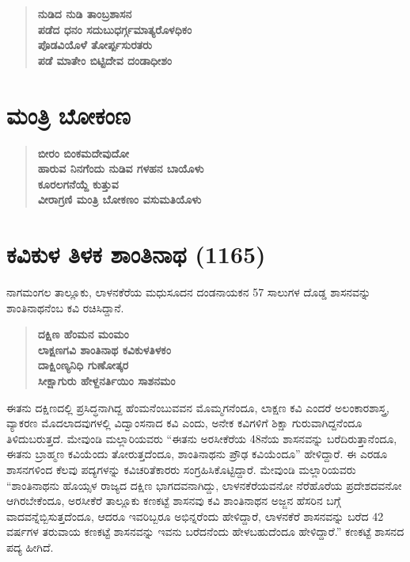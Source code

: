 \begin{verse}
\textbf{ನುಡಿದ ನುಡಿ ತಾಂಬ್ರಶಾಸನ} \\\textbf{ಪಡೆದ ಧನಂ ಸದುಬುಧರ್ಗ್ಗಮಾತ್ಯರೊಳಧಿಕಂ} \\\textbf{ಪೊಡವಿಯೊಳೆ ತೋರ್ಪ್ಪಸುರತರು} \\\textbf{ಪಡೆ ಮಾತೇಂ ಬಿಟ್ಟಿದೇವ ದಂಡಾಧೀಶಂ}
\end{verse}


\section{ಮಂತ್ರಿ ಬೋಕಂಣ}

\begin{verse}
\textbf{ಬೀರಂ ಬಿಂಕಮದೇವುದೋ} \\\textbf{ಹಾರುವ ನಿನಗೆಂದು ನುಡಿವ ಗಳಹನ ಬಾಯೊಳು} \\\textbf{ಕೂರಲಗನೆಯ್ದೆ ಕುತ್ತುವ} \\\textbf{ವೀರಾಗ್ರಣಿ ಮಂತ್ರಿ ಬೋಕಣಂ ವಸುಮತಿಯೊಳು}
\end{verse}


\section{ಕವಿಕುಳ ತಿಳಕ ಶಾಂತಿನಾಥ (1165)}

ನಾಗಮಂಗಲ ತಾಲ್ಲೂಕು, ಲಾಳನಕೆರೆಯ ಮಧುಸೂದನ ದಂಡನಾಯಕನ 57 ಸಾಲುಗಳ ದೊಡ್ಡ ಶಾಸನವನ್ನು ಶಾಂತಿನಾಥನೆಂಬ ಕವಿ ರಚಿಸಿದ್ದಾನೆ.

\begin{verse}
\textbf{ದಕ್ಷಿಣ ಹೆಂಮನ ಮಂಮಂ } \\\textbf{ಲಾಕ್ಷಣಗವಿ ಶಾಂತಿನಾಥ ಕವಿಕುಳತಿಳಕಂ} \\\textbf{ದಾಕ್ಷಿಂಣ್ಯನಿಧಿ ಗುಣೋತ್ಕರ } \\\textbf{ಸೀಕ್ಷಾಗುರು ಹೇಳ್ದನರ್ತಿಯಿಂ ಸಾಶನಮಂ}
\end{verse}

ಈತನು ದಕ್ಷಿಣದಲ್ಲಿ ಪ್ರಸಿದ್ಧನಾಗಿದ್ದ ಹೆಂಮನೆಂಬುವವನ ಮೊಮ್ಮಗನೆಂದೂ, ಲಾಕ್ಷಣ ಕವಿ ಎಂದರೆ ಅಲಂಕಾರಶಾಸ್ತ್ರ, ವ್ಯಾಕರಣ ಮೊದಲಾದವುಗಳಲ್ಲಿ ವಿದ್ವಾಂಸನಾದ ಕವಿ ಎಂದು, ಅನೇಕ ಕವಿಗಳಿಗೆ ಶಿಕ್ಷಾ ಗುರುವಾಗಿದ್ದನೆಂದೂ ತಿಳಿದುಬರುತ್ತದೆ. ಮೇವುಂಡಿ ಮಲ್ಲಾರಿಯವರು “ಈತನು ಅರಸೀಕೆರೆಯ 48ನೆಯ ಶಾಸನವನ್ನು ಬರೆದಿರುತ್ತಾನೆಂದೂ, ಈತನು ಬ್ರಾಹ್ಮಣ ಕವಿಯೆಂದು ತೋರುತ್ತ\-ದೆಂದೂ, ಶಾಂತಿನಾಥನು ಪ್ರೌಢ ಕವಿಯೆಂದೂ” ಹೇಳಿದ್ದಾರೆ. ಈ ಎರಡೂ ಶಾಸನಗಳಿಂದ ಕೆಲವು ಪದ್ಯಗಳನ್ನು ಕವಿಚರಿತೆಕಾರರು ಸಂಗ್ರಹಿಸಿಕೊಟ್ಟಿದ್ದಾರೆ. ಮೇವುಂಡಿ ಮಲ್ಲಾರಿಯವರು “ಶಾಂತಿನಾಥನು ಹೊಯ್ಸಳ ರಾಜ್ಯದ ದಕ್ಷಿಣ ಭಾಗದವನಾಗಿದ್ದು, ಲಾಳನಕೆರೆಯವನೋ ನೆರೆಹೊರೆಯ ಪ್ರದೇಶದವನೋ ಆಗಿರಬೇಕೆಂದೂ, ಅರಸೀಕೆರೆ ತಾಲ್ಲೂಕು ಕಣಕಟ್ಟೆ ಶಾಸನವು ಕವಿ ಶಾಂತಿನಾಥನ ಅಜ್ಜನ ಹೆಸರಿನ ಬಗ್ಗೆ ವಾದವನ್ನೆಬ್ಬಿಸುತ್ತದೆಂದೂ, ಆದರೂ ಇವರಿಬ್ಬರೂ ಅಭಿನ್ನರೆಂದು ಹೇಳಿದ್ದಾರೆ, ಲಾಳನಕೆರೆ ಶಾಸನವನ್ನು ಬರೆದ 42 ವರ್ಷಗಳ ತರುವಾಯ ಕಣಕಟ್ಟೆ ಶಾಸನವನ್ನು ಇವನು ಬರೆದನೆಂದು ಹೇಳಬಹುದೆಂದೂ ಹೇಳಿದ್ದಾರೆ.” ಕಣಕಟ್ಟೆ ಶಾಸನದ ಪದ್ಯ ಹೀಗಿದೆ.

